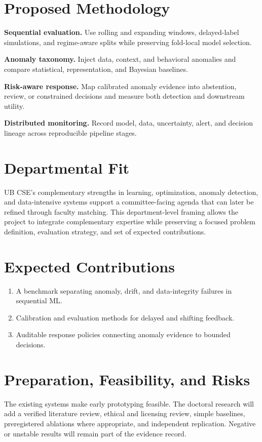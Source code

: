 \documentclass[11pt]{article}
\begin{document}
\section*{Proposed Methodology}
\textbf{Sequential evaluation.} Use rolling and expanding windows, delayed-label simulations, and regime-aware splits while preserving fold-local model selection.

\textbf{Anomaly taxonomy.} Inject data, context, and behavioral anomalies and compare statistical, representation, and Bayesian baselines.

\textbf{Risk-aware response.} Map calibrated anomaly evidence into abstention, review, or constrained decisions and measure both detection and downstream utility.

\textbf{Distributed monitoring.} Record model, data, uncertainty, alert, and decision lineage across reproducible pipeline stages.

\newpage
\section*{Departmental Fit}
UB CSE's complementary strengths in learning, optimization, anomaly detection, and data-intensive systems support a committee-facing agenda that can later be refined through faculty matching. This department-level framing allows the project to integrate complementary expertise while preserving a focused problem definition, evaluation strategy, and set of expected contributions.

\section*{Expected Contributions}
\begin{enumerate}
\item A benchmark separating anomaly, drift, and data-integrity failures in sequential ML.
\item Calibration and evaluation methods for delayed and shifting feedback.
\item Auditable response policies connecting anomaly evidence to bounded decisions.
\end{enumerate}

\section*{Preparation, Feasibility, and Risks}
The existing systems make early prototyping feasible. The doctoral research will add a verified literature review, ethical and licensing review, simple baselines, preregistered ablations where appropriate, and independent replication. Negative or unstable results will remain part of the evidence record.
\end{document}

